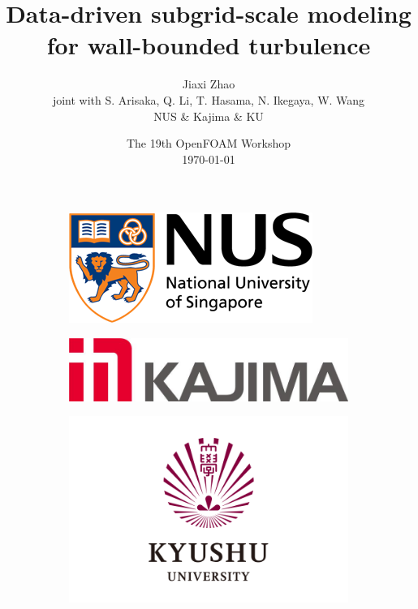 \documentclass[paper slide]{beamer}
\title[Data-driven SGS modeling]{Data-driven subgrid-scale modeling for wall-bounded turbulence}
\author[J. Zhao]{Jiaxi Zhao \\ \small joint with S. Arisaka, Q. Li, T. Hasama, N. Ikegaya, W. Wang \\
\small NUS \& Kajima \& KU}
\date[\today]{The 19th OpenFOAM Workshop \\ \today}
\begin{document}
\par \setlength{\parindent}{2em}

\begin{frame}
\titlepage
\begin{figure}[ht]
	\centering
	\begin{subfigure}[b]{0.32\textwidth}
		\includegraphics[width=.8\textwidth]{fig/nus-logo-horizon.png}
	\end{subfigure}
	\begin{subfigure}[b]{0.32\textwidth}
		\includegraphics[width=.8\textwidth]{fig/kajima-logo.jpg}
	\end{subfigure}
	\begin{subfigure}[b]{0.32\textwidth}
		\includegraphics[width=.8\textwidth]{fig/ku_logo.jpg}
	\end{subfigure}
\end{figure}
\end{frame}
\end{document}
